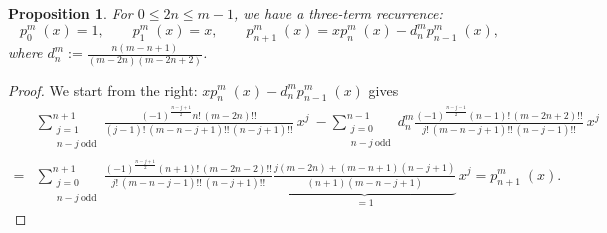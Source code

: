\documentclass{amsart}
\newcommand{\p}[2]{p_{#1}^{#2}\;\!\!}
\newcommand{\coloneqq}{:=}
\theoremstyle{plain}
\newtheorem{proposition}[theorem]{Proposition}
\theoremstyle{definition}
\theoremstyle{remark}
\begin{document}
\begin{proposition} \label{threeterm} For $0\leq 2n\leq m-1$, we have a three-term recurrence:
\begin{equation*}
\p{0}{m}(x) = 1,\qquad \p{1}{m}(x) = x, \qquad \p{n+1}{m}(x) = x\p{n}{m}(x) -d_n^m \p{n-1}{m}(x),
\end{equation*} 
where $d_n^m\coloneqq \frac{n(m-n+1)}{(m-2n)(m-2n+2)}$.
\end{proposition}
\begin{proof}
We start from the right: $ x\p{n}{m}(x) -d_n^m \p{n-1}{m}(x)$ gives
\begin{align*}
 &\textstyle \sum\limits_{\substack{j=1\\ n-j\ \text{odd}}}^{n+1} \!\!\!\frac{(-1)^{\frac{n-j+1}{2}} n!\,(m-2n)!!}{(j-1)!\,(m-n-j+1)!!\,(n-j+1)!!}\: x^j 
\ - \sum\limits_{\substack{j=0\\ n-j\ \text{odd}}}^{n-1} \!\!\!d_n^m\frac{(-1)^{\frac{n-j-1}{2}} (n-1)!\,(m-2n+2)!!}{j!\,(m-n-j+1)!!\,(n-j-1)!!}\: x^j 
\\=&\textstyle \sum\limits_{\substack{j=0\\ n-j\ \text{odd}}}^{n+1} \!\!\!\frac{(-1)^{\frac{n-j+1}{2}} (n+1)!\,(m-2n-2)!!}{j!\,(m-n-j-1)!!\,(n-j+1)!!}\underbrace{\textstyle
\frac{j(m-2n)+(m-n+1)(n-j+1)}{(n+1)(m-n-j+1)}}_{=1} \,x^j = \p{n+1}{m}(x) .
\end{align*}
\end{proof}
\end{document}
